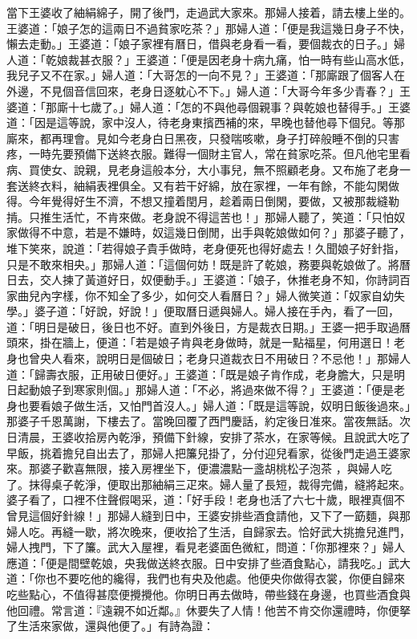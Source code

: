 當下王婆收了紬絹綿子，開了後門，走過武大家來。那婦人接着，請去樓上坐的。王婆道：「娘子怎的這兩日不過貧家吃茶？」那婦人道：「便是我這幾日身子不快，懶去走動。」王婆道：「娘子家裡有曆日，借與老身看一看，要個裁衣的日子。」婦人道：「乾娘裁甚衣服？」王婆道：「便是因老身十病九痛，怕一時有些山高水低，我兒子又不在家。」婦人道：「大哥怎的一向不見？」王婆道：「那廝跟了個客人在外邊，不見個音信回來，老身日逐躭心不下。」婦人道：「大哥今年多少青春？」王婆道：「那廝十七歲了。」婦人道：「怎的不與他尋個親事？與乾娘也替得手。」王婆道：「因是這等說，家中沒人，待老身東擯西補的來，早晚也替他尋下個兒。等那廝來，都再理會。見如今老身白日黑夜，只發喘咳嗽，身子打碎般睡不倒的只害疼，一時先要預備下送終衣服。難得一個財主官人，常在貧家吃茶。但凡他宅里看病、買使女、說親，見老身這般本分，大小事兒，無不照顧老身。又布施了老身一套送終衣料，紬絹表裡俱全。又有若干好綿，放在家裡，一年有餘，不能勾閑做得。今年覺得好生不濟，不想又撞着閏月，趁着兩日倒閑，要做，又被那裁縫勒掯。只推生活忙，不肯來做。老身說不得這苦也！」那婦人聽了，笑道：「只怕奴家做得不中意，若是不嫌時，奴這幾日倒閒，出手與乾娘做如何？」那婆子聽了，堆下笑來，說道：「若得娘子貴手做時，老身便死也得好處去！久聞娘子好針指，只是不敢來相央。」那婦人道：「這個何妨！既是許了乾娘，務要與乾娘做了。將曆日去，交人揀了黃道好日，奴便動手。」王婆道：「娘子，休推老身不知，你詩詞百家曲兒內字樣，你不知全了多少，如何交人看曆日？」婦人微笑道：「奴家自幼失學。」婆子道：「好說，好說！」便取曆日遞與婦人。婦人接在手內，看了一回，道：「明日是破日，後日也不好。直到外後日，方是裁衣日期。」王婆一把手取過曆頭來，掛在牆上，便道：「若是娘子肯與老身做時，就是一點福星，何用選日！老身也曾央人看來，說明日是個破日；老身只道裁衣日不用破日？不忌他！」那婦人道：「歸壽衣服，正用破日便好。」王婆道：「既是娘子肯作成，老身膽大，只是明日起動娘子到寒家則個。」那婦人道：「不必，將過來做不得？」王婆道：「便是老身也要看娘子做生活，又怕門首沒人。」婦人道：「既是這等說，奴明日飯後過來。」那婆子千恩萬謝，下樓去了。當晚回覆了西門慶話，約定後日准來。當夜無話。次日清晨，王婆收拾房內乾淨，預備下針線，安排了茶水，在家等候。且說武大吃了早飯，挑着擔兒自出去了，那婦人把簾兒掛了，分付迎兒看家，從後門走過王婆家來。那婆子歡喜無限，接入房裡坐下，便濃濃點一盞胡桃松子泡茶 ，與婦人吃了。抹得桌子乾淨，便取出那紬絹三疋來。婦人量了長短，裁得完備，縫將起來。婆子看了，口裡不住聲假喝采，道：「好手段！老身也活了六七十歲，眼裡真個不曾見這個好針線！」那婦人縫到日中，王婆安排些酒食請他，又下了一筯麵，與那婦人吃。再縫一歇，將次晚來，便收拾了生活，自歸家去。恰好武大挑擔兒進門，婦人拽門，下了簾。武大入屋裡，看見老婆面色微紅，問道：「你那裡來？」婦人應道：「便是間壁乾娘，央我做送終衣服。日中安排了些酒食點心，請我吃。」武大道：「你也不要吃他的纔得，我們也有央及他處。他便央你做得衣裳，你便自歸來吃些點心，不值得甚麼便攪攪他。你明日再去做時，帶些錢在身邊，也買些酒食與他回禮。常言道：『遠親不如近鄰。』休要失了人情！他苦不肯交你還禮時，你便拏了生活來家做，還與他便了。」有詩為證：

